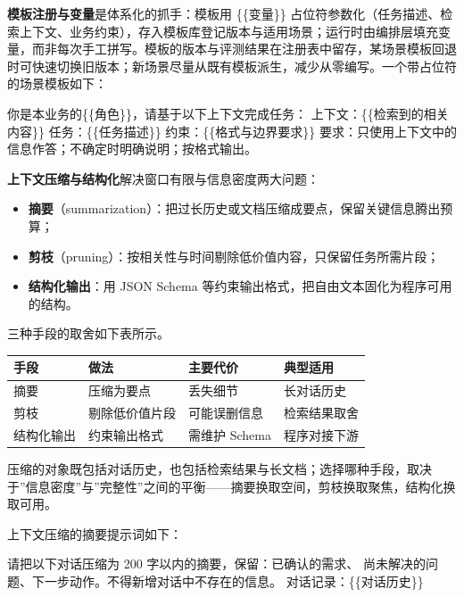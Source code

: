 \documentclass[
]{ctexbook}
\providecommand{\tightlist}{\setlength{\itemsep}{0pt}\setlength{\parskip}{0pt} }
\newenvironment{Shaded}{
  \ttfamily\small
}{}
\newcommand{\NormalTok}[1]{#1}
\newcounter{none}
\begin{document}
\textbf{模板注册与变量}是体系化的抓手：模板用 \{\{变量\}\}
占位符参数化（任务描述、检索上下文、业务约束），存入模板库登记版本与适用场景；运行时由编排层填充变量，而非每次手工拼写。模板的版本与评测结果在注册表中留存，某场景模板回退时可快速切换旧版本；新场景尽量从既有模板派生，减少从零编写。一个带占位符的场景模板如下：

\begin{Shaded}
\begin{Highlighting}[]
\NormalTok{你是本业务的\{\{角色\}\}，请基于以下上下文完成任务：}
\NormalTok{上下文：\{\{检索到的相关内容\}\}}
\NormalTok{任务：\{\{任务描述\}\}}
\NormalTok{约束：\{\{格式与边界要求\}\}}
\NormalTok{要求：只使用上下文中的信息作答；不确定时明确说明；按格式输出。}
\end{Highlighting}
\end{Shaded}

\textbf{上下文压缩与结构化}解决窗口有限与信息密度两大问题：

\begin{itemize}
\tightlist
\item
  \textbf{摘要}（summarization）：把过长历史或文档压缩成要点，保留关键信息腾出预算；
\item
  \textbf{剪枝}（pruning）：按相关性与时间剔除低价值内容，只保留任务所需片段；
\item
  \textbf{结构化输出}：用 JSON Schema
  等约束输出格式，把自由文本固化为程序可用的结构。
\end{itemize}

三种手段的取舍如下表所示。

{\def\LTcaptype{none} %
\begin{longtable}[]{@{}llll@{}}
\toprule\noalign{}
手段 & 做法 & 主要代价 & 典型适用 \\
\midrule\noalign{}
\endhead
\bottomrule\noalign{}
\endlastfoot
摘要 & 压缩为要点 & 丢失细节 & 长对话历史 \\
剪枝 & 剔除低价值片段 & 可能误删信息 & 检索结果取舍 \\
结构化输出 & 约束输出格式 & 需维护 Schema & 程序对接下游 \\
\end{longtable}
}

压缩的对象既包括对话历史，也包括检索结果与长文档；选择哪种手段，取决于''信息密度''与''完整性''之间的平衡------摘要换取空间，剪枝换取聚焦，结构化换取可用。

上下文压缩的摘要提示词如下：

\begin{Shaded}
\begin{Highlighting}[]
\NormalTok{请把以下对话压缩为 200 字以内的摘要，保留：已确认的需求、}
\NormalTok{尚未解决的问题、下一步动作。不得新增对话中不存在的信息。}
\NormalTok{对话记录：\{\{对话历史\}\}}
\end{Highlighting}
\end{Shaded}
\end{document}
